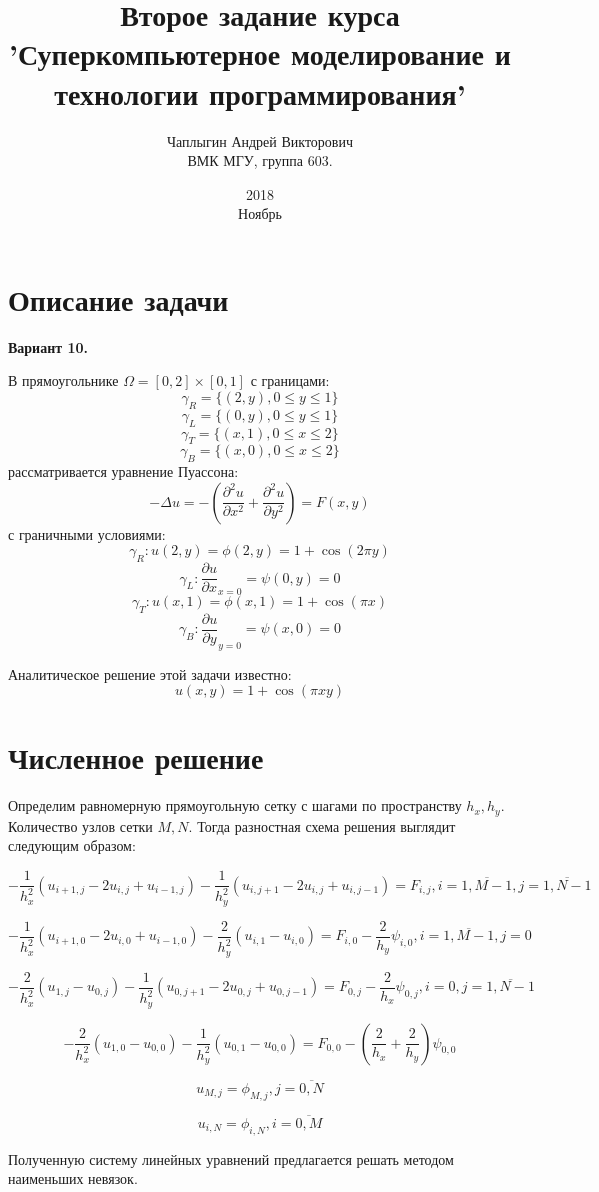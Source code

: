 \documentclass[12pt]{article}
\title{Второе задание курса 'Суперкомпьютерное моделирование и технологии программирования'}
\date{2018\\ Ноябрь}
\author{Чаплыгин Андрей Викторович\\  ВМК МГУ, группа 603.}
\def\d#1#2{\frac{\partial#1}{\partial#2}}
\def\dd#1#2{\frac{\partial^2 #1}{\partial#2^2}}
\begin{document}
\maketitle
\section{Описание задачи}
{\bf Вариант 10.} 

В прямоугольнике $\Omega = [0, 2] \times [0, 1]$ с границами:
$$ \gamma_R = \{(2, y), 0 \leq y \leq 1 \} $$
$$ \gamma_L = \{(0, y), 0 \leq y \leq 1 \} $$
$$ \gamma_T = \{(x, 1), 0 \leq x \leq 2 \} $$
$$ \gamma_B = \{(x, 0), 0 \leq x \leq 2 \} $$
рассматривается уравнение Пуассона:
$$ -\Delta u = -(\dd{u}{x} + \dd{u}{y}) = F(x, y) $$
с граничными условиями:
$$ \gamma_R: u(2, y) = \phi(2, y) = 1 + \cos(2 \pi y) $$
$$ \gamma_L: \d{u}{x}_{x=0} = \psi(0, y) = 0 $$
$$ \gamma_T: u(x, 1) = \phi(x, 1) = 1 + \cos(\pi x) $$
$$ \gamma_B: \d{u}{y}_{y=0} = \psi(x, 0) = 0 $$

Аналитическое решение этой задачи известно:
$$ u(x, y) = 1 + \cos(\pi x y) $$

\section{Численное решение}
Определим равномерную прямоугольную сетку с шагами по пространству $h_x, h_y$. 
Количество узлов сетки $M, N$. Тогда разностная схема решения выглядит следующим образом:

$$ -\frac{1}{h_x^2} (u_{i+1, j} - 2u_{i, j} + u_{i-1, j}) 
   -\frac{1}{h_y^2} (u_{i, j+1} - 2u_{i, j} + u_{i, j-1}) = F_{i, j}, 
   i = \overline{1, M-1}, j = \overline{1, N-1} $$

$$ -\frac{1}{h_x^2} (u_{i+1, 0} - 2u_{i, 0} + u_{i-1, 0}) 
   -\frac{2}{h_y^2} (u_{i, 1} - u_{i, 0}) = F_{i, 0} - \frac{2}{h_y} \psi_{i, 0}, 
   i = \overline{1, M-1}, j = 0 $$

$$ -\frac{2}{h_x^2} (u_{1, j} - u_{0, j}) 
   -\frac{1}{h_y^2} (u_{0, j+1} - 2u_{0, j} + u_{0, j-1}) = F_{0, j} - \frac{2}{h_x} \psi_{0, j}, 
   i = 0, j = \overline{1, N-1} $$   
  
$$ -\frac{2}{h_x^2} (u_{1, 0} - u_{0, 0}) 
   -\frac{1}{h_y^2} (u_{0, 1} - u_{0, 0}) = F_{0, 0} - (\frac{2}{h_x} + \frac{2}{h_y}) \psi_{0, 0} $$
   
$$ u_{M, j} = \phi_{M, j}, j = \overline{0, N} $$

$$ u_{i, N} = \phi_{i, N}, i = \overline{0, M} $$

Полученную систему линейных уравнений предлагается решать методом наименьших невязок.
\end{document}
